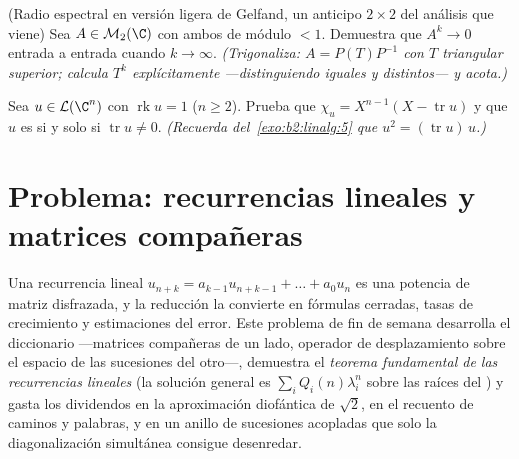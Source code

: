 \begin{exercise}[$\star\star\star$]\label{exo:b2:reduction:11}
(Radio espectral en versión ligera de Gelfand, un anticipo $2\times2$
del análisis que viene) Sea $A \in \mathcal{M}_2(\C)$ con ambos
 de módulo $< 1$. Demuestra que $A^k \to 0$ entrada
a entrada cuando $k \to \infty$. \emph{(Trigonaliza: $A =
P(T)P^{-1}$ con $T$ triangular superior; calcula $T^k$
explícitamente ---distinguiendo  iguales y
distintos--- y acota.)}
\end{exercise}

\begin{exercise}[$\star\star$]\label{exo:b2:reduction:12}
Sea $u \in \mathcal{L}(\C^n)$ con $\operatorname{rk} u = 1$ ($n \geq
2$). Prueba que $\chi_u = X^{n-1}(X - \operatorname{tr} u)$ y que $u$
es  si y solo si $\operatorname{tr} u \neq 0$.
\emph{(Recuerda del~\cref{exo:b2:linalg:5} que $u^2 =
(\operatorname{tr} u)\,u$.)}
\end{exercise}

\section{Problema: recurrencias lineales y matrices compañeras}

Una recurrencia lineal $u_{n+k} = a_{k-1}u_{n+k-1} + \dots + a_0 u_n$
es una potencia de matriz disfrazada, y la reducción la convierte en
fórmulas cerradas, tasas de crecimiento y estimaciones del error. Este
problema de fin de semana desarrolla el diccionario ---matrices
compañeras de un lado, operador de desplazamiento sobre el espacio de
las sucesiones del otro---, demuestra el \emph{teorema fundamental de
las recurrencias lineales} (la solución general es $\sum_i
Q_i(n)\lambda_i^n$ sobre las raíces del ) y
gasta los dividendos en la aproximación diofántica de $\sqrt2$, en el
recuento de caminos y palabras, y en un anillo de sucesiones acopladas
que solo la diagonalización simultánea consigue desenredar.

